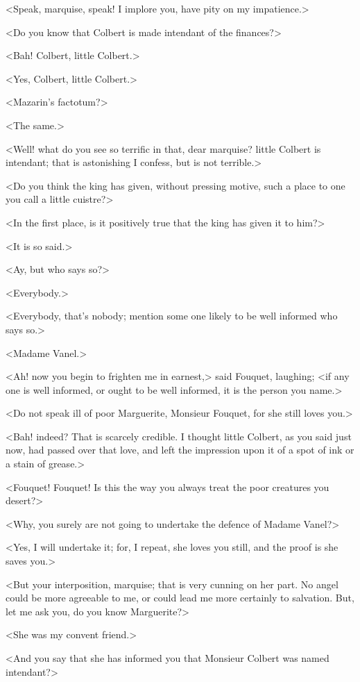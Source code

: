 <Speak, marquise, speak! I implore you, have pity on my impatience.>

<Do you know that Colbert is made intendant of the finances?>

<Bah! Colbert, little Colbert.>

<Yes, Colbert, little Colbert.>

<Mazarin's factotum?>

<The same.>

<Well! what do you see so terrific in that, dear marquise? little Colbert is intendant; that is astonishing I confess, but is not terrible.>

<Do you think the king has given, without pressing motive, such a place to one you call a little cuistre?>

<In the first place, is it positively true that the king has given it to him?>

<It is so said.>

<Ay, but who says so?>

<Everybody.>

<Everybody, that's nobody; mention some one likely to be well informed who says so.>

<Madame Vanel.>

<Ah! now you begin to frighten me in earnest,> said Fouquet, laughing; <if any one is well informed, or ought to be well informed, it is the person you name.>

<Do not speak ill of poor Marguerite, Monsieur Fouquet, for she still loves you.>

<Bah! indeed? That is scarcely credible. I thought little Colbert, as you said just now, had passed over that love, and left the impression upon it of a spot of ink or a stain of grease.>

<Fouquet! Fouquet! Is this the way you always treat the poor creatures you desert?>

<Why, you surely are not going to undertake the defence of Madame Vanel?>

<Yes, I will undertake it; for, I repeat, she loves you still, and the proof is she saves you.>

<But your interposition, marquise; that is very cunning on her part. No angel could be more agreeable to me, or could lead me more certainly to salvation. But, let me ask you, do you know Marguerite?>

<She was my convent friend.>

<And you say that she has informed you that Monsieur Colbert was named intendant?>

